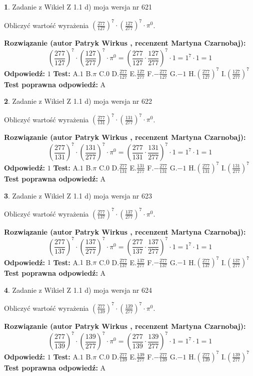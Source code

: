 \documentclass[12pt, a4paper]{article}
\theoremstyle{definition} %
\newtheorem{zad}{}
\newcommand{\zadStart}[1]{\begin{zad}#1\newline}
\newcommand{\zadStop}{\end{zad}}
\newcommand{\rozwStart}[2]{\noindent \textbf{Rozwiązanie (autor #1 , recenzent #2): }\newline}
\newcommand{\rozwStop}{\newline}
\newcommand{\odpStart}{\noindent \textbf{Odpowiedź:}\newline}
\newcommand{\odpStop}{\newline}
\newcommand{\testStart}{\noindent \textbf{Test:}\newline}
\newcommand{\testStop}{\newline}
\newcommand{\kluczStart}{\noindent \textbf{Test poprawna odpowiedź:}\newline}
\newcommand{\kluczStop}{\newline}
\begin{document}
\zadStart{Zadanie z Wikieł Z 1.1 d) moja wersja nr 621}

Obliczyć wartość wyrażenia $(\frac{277}{127})^{7} \cdot (\frac{127}{277})^{7} \cdot \pi^{0}$.
\zadStop
\rozwStart{Patryk Wirkus}{Martyna Czarnobaj}
$$(\frac{277}{127})^{7} \cdot (\frac{127}{277})^{7} \cdot \pi^{0} = (\frac{277}{127} \cdot \frac{127}{277})^{7} \cdot 1 = 1^{7} \cdot 1 = 1$$
\rozwStop
\odpStart
$1$
\odpStop
\testStart
A.$1$ B.$\pi$ C.$0$ D.$\frac{277}{127}$ E.$\frac{127}{277}$
F.$-\frac{277}{127}$ G.$-1$
H.$(\frac{277}{127})^{7}$
I.$(\frac{127}{277})^{7}$
\testStop
\kluczStart
A
\kluczStop



\zadStart{Zadanie z Wikieł Z 1.1 d) moja wersja nr 622}

Obliczyć wartość wyrażenia $(\frac{277}{131})^{7} \cdot (\frac{131}{277})^{7} \cdot \pi^{0}$.
\zadStop
\rozwStart{Patryk Wirkus}{Martyna Czarnobaj}
$$(\frac{277}{131})^{7} \cdot (\frac{131}{277})^{7} \cdot \pi^{0} = (\frac{277}{131} \cdot \frac{131}{277})^{7} \cdot 1 = 1^{7} \cdot 1 = 1$$
\rozwStop
\odpStart
$1$
\odpStop
\testStart
A.$1$ B.$\pi$ C.$0$ D.$\frac{277}{131}$ E.$\frac{131}{277}$
F.$-\frac{277}{131}$ G.$-1$
H.$(\frac{277}{131})^{7}$
I.$(\frac{131}{277})^{7}$
\testStop
\kluczStart
A
\kluczStop



\zadStart{Zadanie z Wikieł Z 1.1 d) moja wersja nr 623}

Obliczyć wartość wyrażenia $(\frac{277}{137})^{7} \cdot (\frac{137}{277})^{7} \cdot \pi^{0}$.
\zadStop
\rozwStart{Patryk Wirkus}{Martyna Czarnobaj}
$$(\frac{277}{137})^{7} \cdot (\frac{137}{277})^{7} \cdot \pi^{0} = (\frac{277}{137} \cdot \frac{137}{277})^{7} \cdot 1 = 1^{7} \cdot 1 = 1$$
\rozwStop
\odpStart
$1$
\odpStop
\testStart
A.$1$ B.$\pi$ C.$0$ D.$\frac{277}{137}$ E.$\frac{137}{277}$
F.$-\frac{277}{137}$ G.$-1$
H.$(\frac{277}{137})^{7}$
I.$(\frac{137}{277})^{7}$
\testStop
\kluczStart
A
\kluczStop



\zadStart{Zadanie z Wikieł Z 1.1 d) moja wersja nr 624}

Obliczyć wartość wyrażenia $(\frac{277}{139})^{7} \cdot (\frac{139}{277})^{7} \cdot \pi^{0}$.
\zadStop
\rozwStart{Patryk Wirkus}{Martyna Czarnobaj}
$$(\frac{277}{139})^{7} \cdot (\frac{139}{277})^{7} \cdot \pi^{0} = (\frac{277}{139} \cdot \frac{139}{277})^{7} \cdot 1 = 1^{7} \cdot 1 = 1$$
\rozwStop
\odpStart
$1$
\odpStop
\testStart
A.$1$ B.$\pi$ C.$0$ D.$\frac{277}{139}$ E.$\frac{139}{277}$
F.$-\frac{277}{139}$ G.$-1$
H.$(\frac{277}{139})^{7}$
I.$(\frac{139}{277})^{7}$
\testStop
\kluczStart
A
\kluczStop
\end{document}
